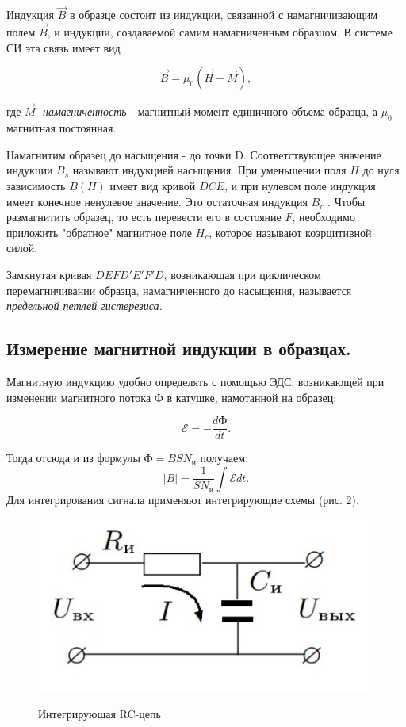 \documentclass[a4paper]{article}
\begin{document}
Индукция $\vec{B}$ в образце состоит из индукции, связанной с намагничивающим полем
$\vec{B}$, и индукции, создаваемой самим намагниченным
образцом.
В системе СИ эта связь имеет вид

$$\vec{B} = \mu_{0}(\vec{H}+\vec{M}),$$

где $\vec{M}$- \textit{намагниченность} - магнитный момент единичного объема образца, а $\mu_{0}$ - магнитная постоянная.

Намагнитим образец до насыщения - до точки D. Соответствующее
значение индукции $B_{s}$ называют индукцией насыщения. При уменьшении поля $H$ до нуля зависимость $B(H)$ имеет вид кривой $DCE$, и при нулевом поле индукция имеет конечное ненулевое значение. Это остаточная индукция $B_{r}$ . Чтобы размагнитить образец, то есть перевести его в состояние
$F$, необходимо приложить "обратное" магнитное
поле $H_{c}$, которое называют коэрцитивной силой.

Замкнутая кривая $DEFD'E'F'D$, возникающая при циклическом
перемагничивании образца, намагниченного до насыщения, называется \textit{предельной петлей гистерезиса.}


\subsection{Измерение магнитной индукции в образцах.}
Магнитную индукцию удобно определять с помощью ЭДС, возникающей при изменении магнитного потока Ф в катушке, намотанной на образец:

$$\mathscr{E} = -\dfrac{dФ}{dt}.$$

Тогда отсюда и из формулы $Ф=BSN_{и}$ получаем:
$$|B|=\dfrac{1}{SN_{и}}\int \mathscr{E}dt.$$
Для интегрирования сигнала применяют интегрирующие схемы (рис. 2).

\begin{figure}
	\vspace{-20pt}
	\begin{center}
		\includegraphics[width=0.7\linewidth]{gist2.jpg}
		\label{fig:sdfsafd}
	\end{center}
	\vspace{-10pt}
	\caption{Интегрирующая RC-цепь}
\end{figure}
\end{document}
